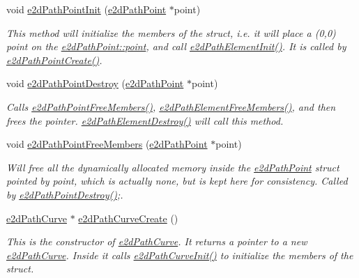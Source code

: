 \begin{DoxyCompactItemize}
void \hyperlink{group__e2dPath_ga482d1c32fa683b06711b1789fab97c3f}{e2d\-Path\-Point\-Init} (\hyperlink{structe2dPathPoint}{e2d\-Path\-Point} $\ast$point)
\begin{DoxyCompactList}\small\item\em This method will initialize the members of the struct, i.\-e. it will place a (0,0) point on the \hyperlink{structe2dPathPoint_afff60c971a4d4728af80b4753d30c5bf}{e2d\-Path\-Point\-::point}, and call \hyperlink{group__e2dPath_ga9d46085324faa70a4bc9134c5bb6f5ad}{e2d\-Path\-Element\-Init()}. It is called by \hyperlink{group__e2dPath_gaca8c21a10fb406bdbe1ac9ac827a9fc1}{e2d\-Path\-Point\-Create()}. \end{DoxyCompactList}\item 
void \hyperlink{group__e2dPath_ga7206672fa712fddc0ef584d9edac87fe}{e2d\-Path\-Point\-Destroy} (\hyperlink{structe2dPathPoint}{e2d\-Path\-Point} $\ast$point)
\begin{DoxyCompactList}\small\item\em Calls \hyperlink{group__e2dPath_ga7171c6c129e8817316bb209b8f1a1bb5}{e2d\-Path\-Point\-Free\-Members()}, \hyperlink{group__e2dPath_ga38c8b4fad1e211dc5ecf36e04835edb4}{e2d\-Path\-Element\-Free\-Members()}, and then frees the pointer. \hyperlink{group__e2dPath_ga2432949311d4f4a1df98e24d28814fee}{e2d\-Path\-Element\-Destroy()} will call this method. \end{DoxyCompactList}\item 
void \hyperlink{group__e2dPath_ga7171c6c129e8817316bb209b8f1a1bb5}{e2d\-Path\-Point\-Free\-Members} (\hyperlink{structe2dPathPoint}{e2d\-Path\-Point} $\ast$point)
\begin{DoxyCompactList}\small\item\em Will free all the dynamically allocated memory inside the \hyperlink{structe2dPathPoint}{e2d\-Path\-Point} struct pointed by point, which is actually none, but is kept here for consistency. Called by \hyperlink{group__e2dPath_ga7206672fa712fddc0ef584d9edac87fe}{e2d\-Path\-Point\-Destroy()};. \end{DoxyCompactList}\item 
\hyperlink{structe2dPathCurve}{e2d\-Path\-Curve} $\ast$ \hyperlink{group__e2dPath_ga2f7a9487dd9b3b90537bfb0a462c72b1}{e2d\-Path\-Curve\-Create} ()
\begin{DoxyCompactList}\small\item\em This is the constructor of \hyperlink{structe2dPathCurve}{e2d\-Path\-Curve}. It returns a pointer to a new \hyperlink{structe2dPathCurve}{e2d\-Path\-Curve}. Inside it calls \hyperlink{group__e2dPath_gaabc13050ca8ad5b9b6d0a4a320ddfab0}{e2d\-Path\-Curve\-Init()} to initialize the members of the struct. \end{DoxyCompactList}\item 

\end{DoxyCompactItemize}
